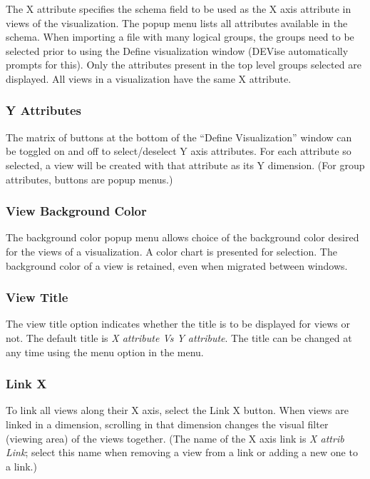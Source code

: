 The X attribute specifies the schema field to be used as the X axis attribute in
views of the visualization. The popup menu lists all attributes available in the
schema. When importing a file with many logical groups, the groups need to be
selected prior to using the Define visualization window (DEVise automatically
prompts for this). Only the attributes present in the top level groups selected
are displayed. All views in a visualization have the same X attribute.

\subsubsection{Y Attributes}

The matrix of buttons at the bottom of the ``Define Visualization'' window can
be toggled on and off to select/deselect Y axis attributes. For each attribute
so selected, a view will be created with that attribute as its Y dimension. (For
group attributes, buttons are popup menus.)

\subsubsection{View Background Color}

The background color popup menu allows choice of the background color desired
for the views of a visualization. A color chart is presented for selection. The
background color of a view is retained, even when migrated between windows.

\subsubsection{View Title}

The view title option indicates whether the title is to be displayed
for views or not. The default title is {\em X attribute Vs Y attribute}.
The title can be changed at any time using the  menu option in
the  menu.

\subsubsection{Link X}

To link all views along their X axis, select the Link X button. When views are
linked in a dimension, scrolling in that dimension changes the visual filter
(viewing area) of the views together. (The name of the X axis link is {\em X
attrib Link}; select this name when removing a view from a link or adding a new
one to a link.)

